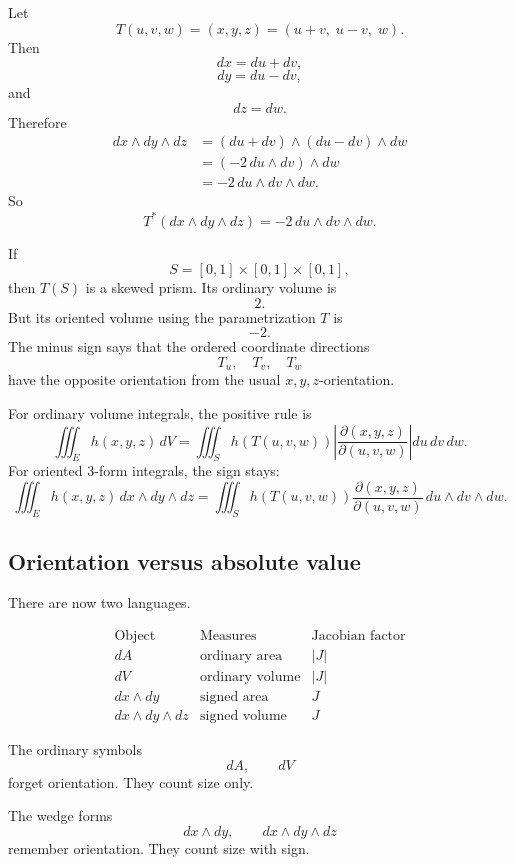 \begin{example}
Let
\[
    T(u,v,w)=(x,y,z)=(u+v,\;u-v,\;w).
\]
Then
\[
    dx=du+dv,
\]
\[
    dy=du-dv,
\]
and
\[
    dz=dw.
\]
Therefore
\[
\begin{aligned}
dx\wedge dy\wedge dz
&=
(du+dv)\wedge(du-dv)\wedge dw\\
&=
(-2\,du\wedge dv)\wedge dw\\
&=
-2\,du\wedge dv\wedge dw.
\end{aligned}
\]
So
\[
\boxed{
    T^*(dx\wedge dy\wedge dz)
    =
    -2\,du\wedge dv\wedge dw.
}
\]

If
\[
    S=[0,1]\times[0,1]\times[0,1],
\]
then \(T(S)\) is a skewed prism.  Its ordinary volume is
\[
    2.
\]
But its oriented volume using the parametrization \(T\) is
\[
    -2.
\]
The minus sign says that the ordered coordinate directions
\[
    T_u,\quad T_v,\quad T_w
\]
have the opposite orientation from the usual \(x,y,z\)-orientation.
\end{example}

For ordinary volume integrals, the positive rule is
\[
\boxed{
    \iiint_E h(x,y,z)\,dV
    =
    \iiint_S h(T(u,v,w))
    \left|
    \frac{\partial(x,y,z)}{\partial(u,v,w)}
    \right|
    du\,dv\,dw.
}
\]
For oriented \(3\)-form integrals, the sign stays:
\[
\boxed{
    \iiint_E h(x,y,z)\,dx\wedge dy\wedge dz
    =
    \iiint_S h(T(u,v,w))
    \frac{\partial(x,y,z)}{\partial(u,v,w)}
    \,du\wedge dv\wedge dw.
}
\]

\subsection{Orientation versus absolute value}

There are now two languages.

\[
\begin{array}{c|c|c}
\text{Object} & \text{Measures} & \text{Jacobian factor} \\ \hline
dA & \text{ordinary area} & |J|\\[1mm]
dV & \text{ordinary volume} & |J|\\[1mm]
dx\wedge dy & \text{signed area} & J\\[1mm]
dx\wedge dy\wedge dz & \text{signed volume} & J
\end{array}
\]

The ordinary symbols
\[
    dA,\qquad dV
\]
forget orientation.  They count size only.

The wedge forms
\[
    dx\wedge dy,\qquad dx\wedge dy\wedge dz
\]
remember orientation.  They count size with sign.

